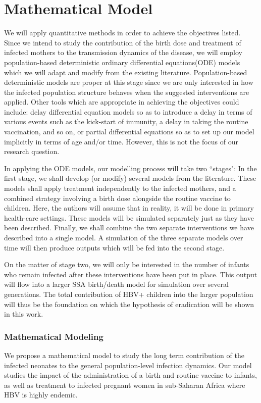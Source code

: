 \chapter{Mathematical Model}
\label{chp:MAT}
We will apply quantitative methods in order to achieve the objectives listed. Since we intend to study the contribution of the birth dose and treatment of infected mothers to the transmission dynamics of the disease, we will employ population-based deterministic ordinary differential equations(ODE) models which we will adapt and modify from the existing literature. Population-based deterministic models are proper at this stage since we are only interested in how the infected population structure behaves when the suggested interventions are applied. Other tools which are appropriate in achieving the objectives could include: delay differential equation models so as to introduce a delay in terms of various events such as the kick-start of immunity, a delay in taking the routine vaccination, and so on, or partial differential equations so as to set up our model implicitly in terms of age and/or time. However, this is not the focus of our research question.

In applying the ODE models, our modelling process will take two ``stages":
In the first stage, we shall develop (or modify) several models from the literature. These models shall apply treatment independently to the infected mothers, and a combined strategy involving a birth dose alongside the routine vaccine to children. Here, the authors will assume that in reality, it will be done in primary health-care settings. These models will be simulated separately just as they have been described. Finally, we shall combine the two separate interventions we have described into a single model. A simulation of the three separate models over time will then produce outputs which will be fed into the second stage. 

On the matter of stage two, we will only be interested in the number of infants who remain infected after these interventions have been put in place. This output will flow into a larger SSA birth/death model for simulation over several generations.  
The total contribution of HBV+ children into the larger population will thus be the foundation
on which the hypothesis of eradication will be shown in this work.

\subsection{Mathematical Modeling}
We propose a mathematical model to study the long term contribution of the infected neonates to the general population-level infection dynamics. Our model studies the  impact of the administration of a birth and routine vaccine to infants, as well as treatment to infected pregnant women in sub-Saharan Africa where HBV is highly endemic.  

